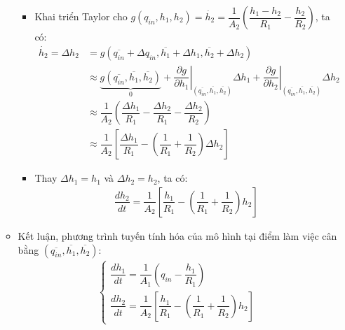 \begin{enumerate}[\it a.]
\begin{itemize}
\begin{itemize}
                        \item Khai triển Taylor cho $g\left({q_{in}, h_1, h_2}\right) = \dot{h_2} = \dfrac{1}{A_2} \left({\dfrac{h_1 - h_2}{R_1} - \dfrac{h_2}{R_2}}\right)$, ta có:
                            \begin{align}
                                \dot{h_2} = \Delta h_2 & = g\left({\overline{q_{in}} + \Delta q_{in}, \overline{h_1} + \Delta h_1, \overline{h_2} + \Delta h_2}\right) \\
                                & \approx \underbrace{g\left({\overline{q_{in}}, \overline{h_1}, \overline{h_2}}\right)}_{0} + \left.\dfrac{\partial g}{\partial h_1}\right|_{\left({\overline{q_{in}}, \overline{h_1}, \overline{h_2}}\right)} \Delta h_1 + \left.\dfrac{\partial g}{\partial h_2}\right|_{\left({\overline{q_{in}}, \overline{h_1}, \overline{h_2}}\right)} \Delta h_2\\
                                & \approx \dfrac{1}{A_2} \left({\dfrac{\Delta h_1}{R_1} - \dfrac{\Delta h_2}{R_1} - \dfrac{\Delta h_2}{R_2}}\right)\\
                                & \approx \dfrac{1}{A_2} \left[{\dfrac{\Delta h_1}{R_1} - \left({\dfrac{1}{R_1} + \dfrac{1}{R_2}}\right) \Delta h_2}\right]
                            \end{align}

                        \item Thay $\Delta h_1= h_1$ và $\Delta h_2 = h_2$, ta có:
                            \begin{align}
                                \dfrac{dh_2}{dt} = \dfrac{1}{A_2} \left[{\dfrac{h_1}{R_1} - \left({\dfrac{1}{R_1} + \dfrac{1}{R_2}}\right) h_2}\right]
                            \end{align}
                    \end{itemize}

                \item Kết luận, phương trình tuyến tính hóa của mô hình tại điểm làm việc cân bằng $\left({\overline{q_{in}}, \overline{h_1}, \overline{h_2}}\right)$:
                    \begin{align}
                        \left\{
                        \begin{array}{l}
                            \dfrac{dh_1}{dt} = \dfrac{1}{A_1} \left({q_{in} - \dfrac{h_1}{R_1}}\right)\\ [.5cm]
                            \dfrac{dh_2}{dt} = \dfrac{1}{A_2} \left[{\dfrac{h_1}{R_1} - \left({\dfrac{1}{R_1} + \dfrac{1}{R_2}}\right) h_2}\right]
                        \end{array}
                        \right.
                    \end{align}
            \end{itemize}


\end{enumerate}
